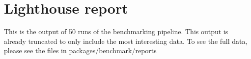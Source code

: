 \chapter{Lighthouse report} %

\label{lighthouse-report}

This is the output of 50 runs of the benchmarking pipeline.
This output is already truncated to only include the most interesting data.
To see the full data, please see the files in packages/benchmark/reports


